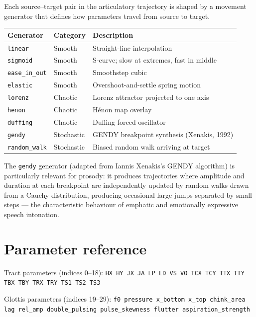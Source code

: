 Each source--target pair in the articulatory trajectory is shaped by a
movement generator that defines how parameters travel from source to target.

\begin{center}
\small
\begin{tabular}{lll}
\toprule
Generator & Category & Description \\
\midrule
\texttt{linear}      & Smooth    & Straight-line interpolation \\
\texttt{sigmoid}     & Smooth    & S-curve; slow at extremes, fast in middle \\
\texttt{ease\_in\_out} & Smooth  & Smoothstep cubic \\
\texttt{elastic}     & Smooth    & Overshoot-and-settle spring motion \\
\texttt{lorenz}      & Chaotic   & Lorenz attractor projected to one axis \\
\texttt{henon}       & Chaotic   & H\'enon map overlay \\
\texttt{duffing}     & Chaotic   & Duffing forced oscillator \\
\texttt{gendy}       & Stochastic & GENDY breakpoint synthesis (Xenakis, 1992) \\
\texttt{random\_walk} & Stochastic & Biased random walk arriving at target \\
\bottomrule
\end{tabular}
\end{center}

The \texttt{gendy} generator (adapted from Iannis Xenakis's GENDY
algorithm) is particularly relevant for prosody: it produces trajectories
where amplitude and duration at each breakpoint are independently updated
by random walks drawn from a Cauchy distribution, producing occasional
large jumps separated by small steps --- the characteristic behaviour of
emphatic and emotionally expressive speech intonation.

\section*{Parameter reference}

Tract parameters (indices 0--18):
\texttt{HX HY JX JA LP LD VS VO TCX TCY TTX TTY TBX TBY TRX TRY TS1 TS2 TS3}

Glottis parameters (indices 19--29):
\texttt{f0 pressure x\_bottom x\_top chink\_area lag rel\_amp double\_pulsing pulse\_skewness flutter aspiration\_strength}

